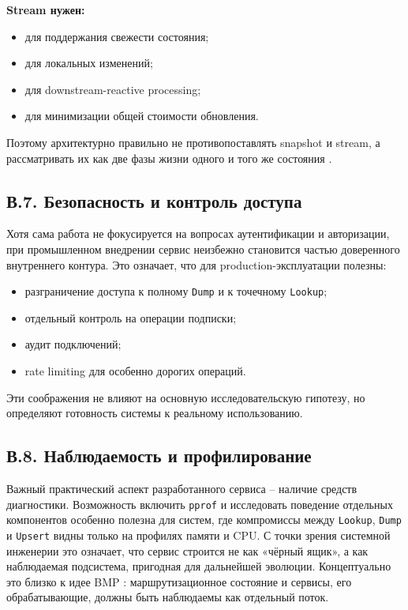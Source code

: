 \textbf{Stream нужен:}

\begin{itemize}
\item для поддержания свежести состояния;
\item для локальных изменений;
\item для downstream-reactive processing;
\item для минимизации общей стоимости обновления.
\end{itemize}

Поэтому архитектурно правильно не противопоставлять snapshot и
stream, а рассматривать их как две фазы жизни одного и того же
состояния \cite{akidau2015dataflow,carbone2015flink}.

\subsection*{В.7. Безопасность и контроль доступа}

Хотя сама работа не фокусируется на вопросах аутентификации и
авторизации, при промышленном внедрении сервис неизбежно становится
частью доверенного внутреннего контура. Это означает, что для
production-эксплуатации полезны:

\begin{itemize}
\item разграничение доступа к полному \texttt{Dump} и к точечному
\texttt{Lookup};
\item отдельный контроль на операции подписки;
\item аудит подключений;
\item rate limiting для особенно дорогих операций.
\end{itemize}

Эти соображения не влияют на основную исследовательскую гипотезу, но
определяют готовность системы к реальному использованию.

\subsection*{В.8. Наблюдаемость и профилирование}

Важный практический аспект разработанного сервиса -- наличие средств
диагностики. Возможность включить \texttt{pprof} и исследовать
поведение отдельных компонентов особенно полезна для систем, где
компромиссы между \texttt{Lookup}, \texttt{Dump} и \texttt{Upsert}
видны только на профилях памяти и CPU. С точки зрения системной
инженерии это означает, что сервис строится не как «чёрный ящик», а
как наблюдаемая подсистема, пригодная для дальнейшей эволюции.
Концептуально это близко к идее BMP \cite{rfc7854}: маршрутизационное
состояние и сервисы, его обрабатывающие, должны быть наблюдаемы как
отдельный поток.

